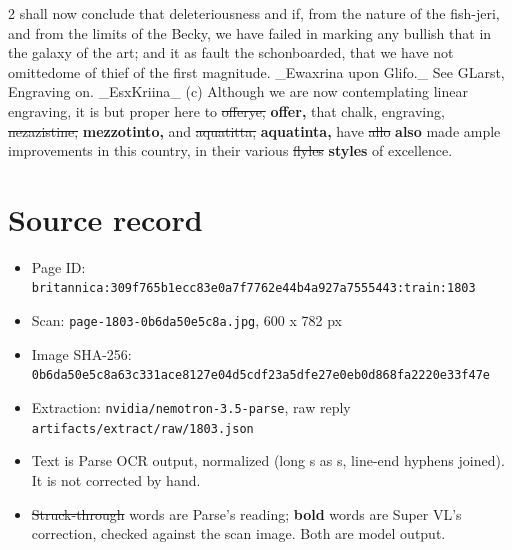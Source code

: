\documentclass[10pt]{article}
\begin{document}
\begin{multicols}{2}
shall now conclude that deleteriousness and if, from the nature of the fish-jeri, and from the limits of the Becky, we have failed in marking any bullish that in the galaxy of the art; and it as fault the schonboarded, that we have not omittedome of thief of the first magnitude. \_Ewaxrina upon Glifo.\_ See GLarst, Engraving on. \_EsxKriina\_ (c) Although we are now contemplating linear engraving, it is but proper here to \sout{offerye,} \textbf{offer,} that chalk, engraving, \sout{nezazistine,} \textbf{mezzotinto,} and \sout{aquatitta,} \textbf{aquatinta,} have \sout{allo} \textbf{also} made ample improvements in this country, in their various \sout{flyles} \textbf{styles} of excellence.
\end{multicols}
\section*{Source record}
\begin{itemize}
\item Page ID: \texttt{britannica:309f765b1ecc83e0a7f7762e44b4a927a7555443:train:1803}
\item Scan: \texttt{page-1803-0b6da50e5c8a.jpg}, 600 x 782 px
\item Image SHA-256: \texttt{\small 0b6da50e5c8a63c331ace8127e04d5cdf23a5dfe27e0eb0d868fa2220e33f47e}
\item Extraction: \texttt{nvidia/nemotron-3.5-parse}, raw reply \texttt{artifacts/extract/raw/1803.json}
\item Text is Parse OCR output, normalized (long s as s, line-end hyphens joined). It is not corrected by hand.
\item \sout{Struck-through} words are Parse's reading; \textbf{bold} words are Super VL's correction, checked against the scan image. Both are model output.
\end{itemize}
\end{document}
